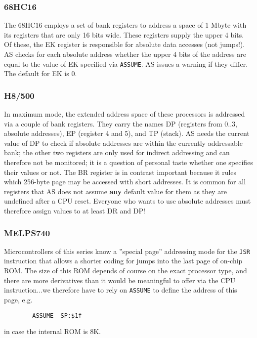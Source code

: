 \documentclass[12pt,twoside]{report}
\newcommand{\bb}[1]{{\bf #1}}
\newcommand{\tty}[1]{{\tt #1}}
\begin{document}
\subsubsection{68HC16}

The 68HC16 employs a set of bank registers to address a space of 1
Mbyte with its registers that are only 16 bits wide.  These registers
supply the upper 4 bits.  Of these, the EK register is responsible
for absolute data accesses (not jumps!).  AS checks for each absolute
address whether the upper 4 bits of the address are equal to the
value of EK specified via \tty{ASSUME}.  AS issues a warning if they
differ.  The default for EK is 0.


\subsubsection{H8/500}

In maximum mode, the extended address space of these processors is
addressed via a couple of bank registers.  They carry the names DP
(registers from 0..3, absolute addresses), EP (register 4 and 5), and TP
(stack).  AS needs the current value of DP to check if absolute addresses
are within the currently addressable bank; the other two registers are
only used for indirect addressing and can therefore not be monitored; it
is a question of personal taste whether one specifies their values or not. 
The BR register is in contrast important because it rules which 256-byte
page may be accessed with short addresses.  It is common for all registers
that AS does not assume \bb{any} default value for them as they are
undefined after a CPU reset.  Everyone who wants to use absolute addresses
must therefore assign values to at least DR and DP!


\subsubsection{MELPS740}

Microcontrollers of this series know a ''special page'' addressing mode
for the \tty{JSR} instruction that allows a shorter coding for jumps into
the last page of on-chip ROM.  The size of this ROM depends of course
on the exact processor type, and there are more derivatives than it
would be meaningful to offer via the CPU instruction...we therefore
have to rely on \tty{ASSUME} to define the address of this page, e.g.
\begin{verbatim}
        ASSUME  SP:$1f
\end{verbatim}
in case the internal ROM is 8K.
\end{document}
